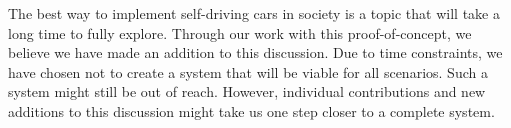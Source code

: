 
The best way to implement self-driving cars in society is a topic that will take a long time to fully explore. Through our work with this proof-of-concept, we believe we have made an addition to this discussion. Due to time constraints, we have chosen not to create a system that will be viable for all scenarios. Such a system might still be out of reach. However, individual contributions and new additions to this discussion might take us one step closer to a complete system.

%
%
% 